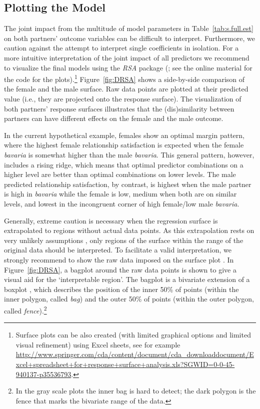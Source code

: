 \documentclass[jou,a4paper,draftfirst]{apa6}
\begin{document}
\subsection{Plotting the Model}
The joint impact from the multitude of model parameters in Table~\ref{tab:s.full.est} on both partners' outcome variables can be difficult to interpret. Furthermore, we caution against the attempt to interpret single coefficients in isolation. For a more intuitive interpretation of the joint impact of all predictors we recommend to visualize the final models using the \emph{RSA} package (; see the online material for the code for the plots).\footnote{Surface plots can be also created (with limited graphical options and limited visual refinement) using Excel sheets, see for example \url{http://www.springer.com/cda/content/document/cda_downloaddocument/Excel+spreadsheet+for+response+surface+analysis.xls?SGWID=0-0-45-940137-p35536793}.} Figure~\ref{fig:DRSA} shows a side-by-side comparison of the female and the male surface. Raw data points are plotted at their predicted value (i.e., they are projected onto the response surface). The visualization of both partners' response surfaces illustrates that the (dis)similarity between partners can have different effects on the female and the male outcome. 

In the current hypothetical example, females show an optimal margin pattern, where the highest female relationship satisfaction is expected when the female \emph{bavaria} is somewhat higher than the male \emph{bavaria}. This general pattern, however, includes a rising ridge, which means that optimal predictor combinations on a higher level are better than optimal combinations on lower levels. The male predicted relationship satisfaction, by contrast, is highest when the male partner is high in \emph{bavaria} while the female is low, medium when both are on similar levels, and lowest in the incongruent corner of high female/low male \emph{bavaria}.

Generally, extreme caution is necessary when the regression surface is extrapolated to regions without actual data points. As this extrapolation rests on very unlikely assumptions \parencite{montgomery_introduction_2012}, only regions of the surface within the range of the original data should be interpreted. To facilitate a valid interpretation, we strongly recommend to show the raw data imposed on the surface plot \parencite[see also][]{wilkinson_statistical_1999,tufte_visual_2001}. In Figure~\ref{fig:DRSA}, a bagplot around the raw data points is shown to give a visual aid for the `interpretable region'. The bagplot is a bivariate extension of a boxplot \parencite{rousseeuw_bagplot:_1999}, which describes the position of the inner 50\% of points (within the inner polygon, called \emph{bag}) and the outer 50\% of points (within the outer polygon, called \emph{fence}).\footnote{In the gray scale plots the inner bag is hard to detect; the dark polygon is the fence that marks the bivariate range of the data.}
\end{document}
